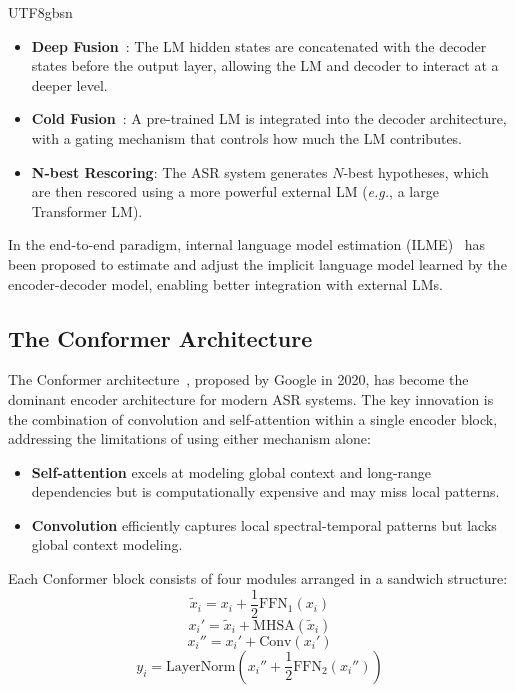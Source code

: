 \documentclass[12pt,a4paper]{article}
\newcommand{\eg}{\textit{e.g.}}
\begin{document}
\begin{CJK}{UTF8}{gbsn}
\begin{itemize}[leftmargin=*]
    \item \textbf{Deep Fusion}~\cite{gulcehre2015using}: The LM hidden states are concatenated with the decoder states before the output layer, allowing the LM and decoder to interact at a deeper level.

    \item \textbf{Cold Fusion}~\cite{sriram2018cold}: A pre-trained LM is integrated into the decoder architecture, with a gating mechanism that controls how much the LM contributes.

    \item \textbf{N-best Rescoring}: The ASR system generates $N$-best hypotheses, which are then rescored using a more powerful external LM (\eg, a large Transformer LM).
\end{itemize}

In the end-to-end paradigm, internal language model estimation (ILME)~\cite{meng2021internal} has been proposed to estimate and adjust the implicit language model learned by the encoder-decoder model, enabling better integration with external LMs.

\subsection{The Conformer Architecture}
\label{subsec:conformer}

The Conformer architecture~\cite{gulati2020conformer}, proposed by Google in 2020, has become the dominant encoder architecture for modern ASR systems. The key innovation is the combination of convolution and self-attention within a single encoder block, addressing the limitations of using either mechanism alone:

\begin{itemize}[leftmargin=*]
    \item \textbf{Self-attention} excels at modeling global context and long-range dependencies but is computationally expensive and may miss local patterns.
    \item \textbf{Convolution} efficiently captures local spectral-temporal patterns but lacks global context modeling.
\end{itemize}

Each Conformer block consists of four modules arranged in a sandwich structure:
\begin{equation}
    \tilde{x}_i = x_i + \frac{1}{2} \text{FFN}_1(x_i)
\end{equation}
\begin{equation}
    x_i' = \tilde{x}_i + \text{MHSA}(\tilde{x}_i)
\end{equation}
\begin{equation}
    x_i'' = x_i' + \text{Conv}(x_i')
\end{equation}
\begin{equation}
    y_i = \text{LayerNorm}(x_i'' + \frac{1}{2} \text{FFN}_2(x_i''))
\end{equation}


\end{CJK}
\end{document}
